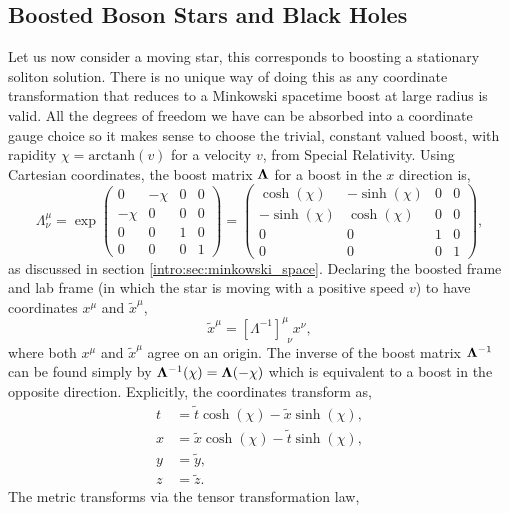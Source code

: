 \subsection{Boosted Boson Stars and Black Holes}\label{boson:sec:boost}
Let us now consider a moving star, this corresponds to boosting a stationary soliton solution. There is no unique way of doing this as any coordinate transformation that reduces to a Minkowski spacetime boost at large radius is valid. All the degrees of freedom we have can be absorbed into a coordinate gauge choice so it makes sense to choose the trivial, constant valued boost, with rapidity $\chi = \mathrm{arctanh} (v)$ for a velocity $v$, from Special Relativity. Using Cartesian coordinates, the boost matrix $\boldsymbol{\Lambda}$ for a boost in the $x$ direction is,
\begin{equation}
\Lambda_\nu^\mu =  \exp\begin{pmatrix} 0 & -\chi & 0& 0 \\ -\chi & 0 & 0 & 0\\ 0 & 0&1&0 \\ 0&0&0&1\end{pmatrix} = \begin{pmatrix} \cosh(\chi) & -\sinh(\chi) & 0& 0 \\ -\sinh(\chi) & \cosh(\chi) & 0 & 0\\ 0 & 0&1&0 \\ 0&0&0&1\end{pmatrix},
\end{equation}
as discussed in section \ref{intro:sec:minkowski_space}. Declaring the boosted frame and lab frame (in which the star is moving with a positive speed $v$) to have coordinates $x^\mu$ and $\tilde{x}^\mu$,
\begin{equation}
\tilde{x}^\mu = [\Lambda^{-1}]^{\mu}_{\,\,\,\nu}x^{\nu},
\end{equation}
where both $x^\mu$ and $\tilde{x}^\mu$ agree on an origin. The inverse of the boost matrix $\boldsymbol{\Lambda}^{-1}$ can be found simply by $\boldsymbol{\Lambda}^{-1}(\chi) = \boldsymbol{\Lambda}(-\chi)$ which is equivalent to a boost in the opposite direction. Explicitly, the coordinates transform as,
\begin{align}
 t &= \tilde{t}\cosh(\chi) - \tilde{x} \sinh(\chi),\\
 x &= \tilde{x}\cosh(\chi)-\tilde{t}\sinh(\chi),\\
 y &= \tilde{y},\\
 z &= \tilde{z} .
\end{align}
The metric transforms via the tensor transformation law,
